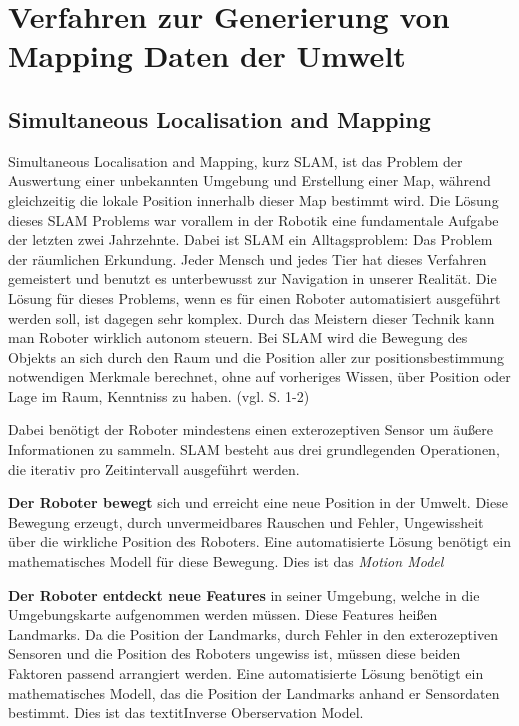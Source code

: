 \chapter{Verfahren zur Generierung von Mapping Daten der Umwelt}

\section{Simultaneous Localisation and Mapping}

Simultaneous Localisation and Mapping, kurz SLAM, ist das Problem der Auswertung einer unbekannten Umgebung und Erstellung einer Map, während gleichzeitig die lokale Position innerhalb dieser Map bestimmt wird. Die Lösung dieses SLAM Problems war vorallem in der Robotik eine fundamentale Aufgabe der letzten zwei Jahrzehnte. Dabei ist SLAM ein Alltagsproblem: Das Problem der räumlichen Erkundung. Jeder Mensch und jedes Tier hat dieses Verfahren gemeistert und benutzt es unterbewusst zur Navigation in unserer Realität. Die Lösung für dieses Problems, wenn es für einen Roboter automatisiert ausgeführt werden soll, ist dagegen sehr komplex. Durch das Meistern dieser Technik kann man Roboter wirklich autonom steuern. 
Bei SLAM wird die Bewegung des Objekts an sich durch den Raum und die Position aller zur positionsbestimmung notwendigen Merkmale berechnet, ohne auf vorheriges Wissen, über Position oder Lage im Raum, Kenntniss zu haben. (vgl. \cite{slam} S. 1-2) 

Dabei benötigt der Roboter mindestens einen exterozeptiven Sensor um äußere Informationen zu sammeln.
SLAM besteht aus drei grundlegenden Operationen, die iterativ pro Zeitintervall ausgeführt werden.

\textbf{Der Roboter bewegt} sich und erreicht eine neue Position in der Umwelt. Diese Bewegung erzeugt, durch unvermeidbares Rauschen und Fehler, Ungewissheit über die wirkliche Position des Roboters. Eine automatisierte Lösung benötigt ein mathematisches Modell für diese Bewegung. Dies ist das \glqq\textit{Motion Model}\grqq

\textbf{Der Roboter entdeckt neue Features} in seiner Umgebung, welche in die Umgebungskarte aufgenommen werden müssen. Diese Features heißen \glqq Landmarks\grqq . Da die Position der Landmarks, durch Fehler in den exterozeptiven Sensoren und die Position des Roboters ungewiss ist, müssen diese beiden Faktoren passend arrangiert werden. Eine automatisierte Lösung benötigt ein mathematisches Modell, das die Position der Landmarks anhand er Sensordaten bestimmt. Dies ist das \glqq textit{Inverse Oberservation Model}. \grqq


